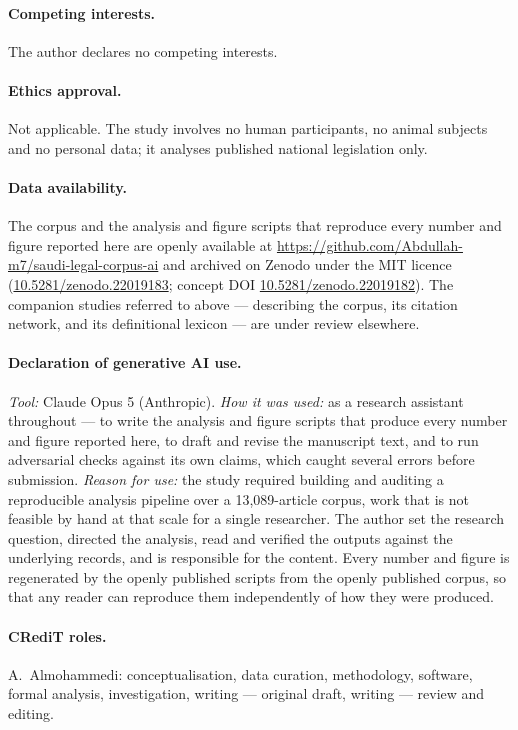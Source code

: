 \documentclass[11pt]{article}
\begin{document}
\paragraph{Competing interests.} The author declares no competing interests.

\paragraph{Ethics approval.} Not applicable. The study involves no human
participants, no animal subjects and no personal data; it analyses published
national legislation only.

\paragraph{Data availability.} The corpus and the analysis and figure scripts
that reproduce every number and figure reported here are openly available at
\url{https://github.com/Abdullah-m7/saudi-legal-corpus-ai} and archived on
Zenodo under the MIT licence
(\href{https://doi.org/10.5281/zenodo.22019183}{10.5281/zenodo.22019183};
concept DOI
\href{https://doi.org/10.5281/zenodo.22019182}{10.5281/zenodo.22019182}).
The companion studies referred to above --- describing the corpus, its
citation network, and its definitional lexicon --- are under review elsewhere.

\paragraph{Declaration of generative AI use.} \emph{Tool:} Claude Opus 5
(Anthropic). \emph{How it was used:} as a research
assistant throughout --- to write the analysis and figure scripts that produce
every number and figure reported here, to draft and revise the manuscript
text, and to run adversarial checks against its own claims, which caught
several errors before submission. \emph{Reason for use:} the study required
building and auditing a reproducible analysis pipeline over a 13,089-article
corpus, work that is not feasible by hand at that scale for a single
researcher. The author set the research question, directed the analysis, read
and verified the outputs against the underlying records, and is responsible
for the content. Every number and figure is regenerated by the openly
published scripts from the openly published corpus, so that any reader can
reproduce them independently of how they were produced.

\paragraph{CRediT roles.} A.~Almohammedi: conceptualisation, data curation,
methodology, software, formal analysis, investigation, writing --- original
draft, writing --- review and editing.
\end{document}

